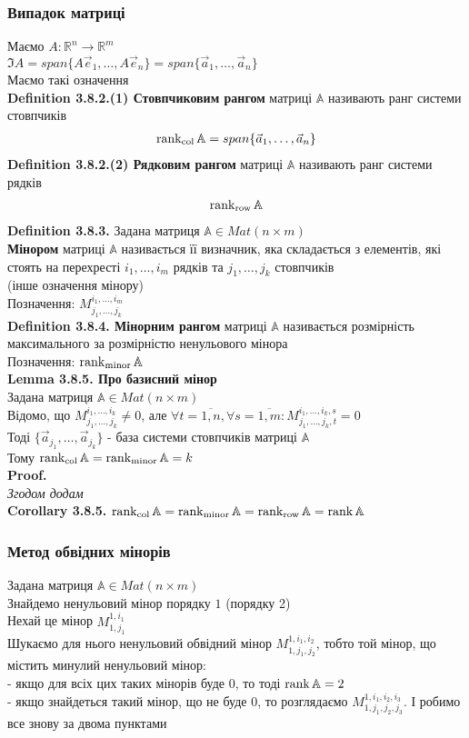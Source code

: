 \documentclass[a4paper, 14pt]{extarticle}
\def\defin#1{\textbf{Definition {#1}}}
\def\lm#1{\textbf{Lemma {#1}}}
\def\crl#1{\textbf{Corollary {#1}}}
\def\proof{\textbf{Proof.}\\}
\def\bigline{\vspace{5mm}\\}
\begin{document}
\subsubsection*{Випадок матриці}
Маємо $A: \mathbb{R}^n \to \mathbb{R}^m$\\
$\Im A = span\{A\vec{e}_1,\dots, A\vec{e}_n\} = span\{\vec{a}_1,\dots,\vec{a}_n\}$\\
Маємо такі означення
\bigline
\defin{3.8.2.(1) Стовпчиковим рангом} матриці $\mathbb{A}$ називають ранг системи стовпчиків
\begin{align*}
\rank_{\textrm{col}} \mathbb{A} = span\{\vec{a}_1,\dots,\vec{a}_n\}
\end{align*}
\defin{3.8.2.(2) Рядковим рангом} матриці $\mathbb{A}$ називають ранг системи рядків
\begin{align*}
\rank_{\textrm{row}} \mathbb{A}
\end{align*}
\defin{3.8.3.} Задана матриця $\mathbb{A} \in Mat(n \times m)$\\
\textbf{Мінором} матриці $\mathbb{A}$ називається її визначник, яка складається з елементів, які стоять на перехресті $i_1,\dots,i_m$ рядків та $j_1,\dots,j_k$ стовпчиків\\
(інше означення мінору)\\
Позначення: $M_{j_1,\dots,j_k}^{i_1,\dots,i_m}$
\bigline
\defin{3.8.4. Мінорним рангом} матриці $\mathbb{A}$ називається розмірність максимального за розмірністю ненульового мінора\\
Позначення: $\rank_{\textrm{minor}} \mathbb{A}$
\bigline
\lm{3.8.5. Про базисний мінор}\\
Задана матриця $\mathbb{A} \in Mat(n \times m)$\\
Відомо, що $M_{j_1,\dots,j_k}^{i_1,\dots,i_k} \neq 0$, але $\forall t = \overline{1,n}, \forall s = \overline{1,m}: M_{j_1,\dots,j_k,t}^{i_1,\dots,i_k,s} = 0$\\
Тоді $\{\vec{a}_{j_1},\dots,\vec{a}_{j_k}\}$ - база системи стовпчиків матриці $\mathbb{A}$\\
Тому $\rank_{\textrm{col}} \mathbb{A} = \rank_{\textrm{minor}} \mathbb{A} = k$\\
\proof
\textit{Згодом додам}
\bigline
\crl{3.8.5.} $\rank_{\textrm{col}} \mathbb{A} = \rank_{\textrm{minor}} \mathbb{A} = \rank_{\textrm{row}} \mathbb{A} = \rank \mathbb{A}$
\bigline
\subsubsection*{Метод обвідних мінорів}
Задана матриця $\mathbb{A} \in Mat(n \times m)$\\
Знайдемо ненульовий мінор порядку $1$ (порядку 2)\\
Нехай це мінор $M_{1,j_1}^{1,i_1}$\\
Шукаємо для нього ненульовий обвідний мінор $M_{1,j_1,j_2}^{1,i_1,i_2}$, тобто той мінор, що містить минулий ненульовий мінор:\\
- якщо для всіх цих таких мінорів буде 0, то тоді $\rank \mathbb{A} = 2$\\
- якщо знайдеться такий мінор, що не буде 0, то розглядаємо $M_{1,j_1,j_2,j_3}^{1,i_1,i_2,i_3}$. І робимо все знову за двома пунктами
\end{document}
